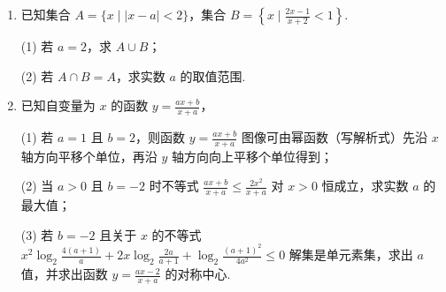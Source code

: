 \documentclass[a4paper,11pt]{article}
\begin{document}
\begin{enumerate}
\item 已知集合 $A=\{x\mid \lvert x-a\rvert<2\}$，集合 $B=\left\{x\mid\frac{2x-1}{x+2}<1\right\}$.

(1) 若 $a=2$，求 $A\cup B$；

(2) 若 $A\cap B=A$，求实数 $a$ 的取值范围.

\ifanswer
\solbegin
{}
\solend
\fi

\item 已知自变量为 $x$ 的函数 $y=\frac{ax+b}{x+a}$，

(1) 若 $a=1$ 且 $b=2$，则函数 $y=\frac{ax+b}{x+a}$ 图像可由幂函数\blankline[4.4em]（写解析式）先沿 $x$ 轴方向\blankline[4.4em]平移\blankline[4.4em]个单位，再沿 $y$ 轴方向向上平移\blankline[4.4em]个单位得到；

(2) 当 $a>0$ 且 $b=-2$ 时不等式 $\frac{ax+b}{x+a}\leqslant\frac{2x^2}{x+a}$ 对 $x>0$ 恒成立，求实数 $a$ 的最大值；

(3) 若 $b=-2$ 且关于 $x$ 的不等式 $x^2\log_2\frac{4(a+1)}a+2x\log_2\frac{2a}{a+1}+\log_2\frac{(a+1)^2}{4a^2}\leqslant0$ 解集是单元素集，求出 $a$ 值，并求出函数 $y=\frac{ax-2}{x+a}$ 的对称中心.


\end{enumerate}
\end{document}
